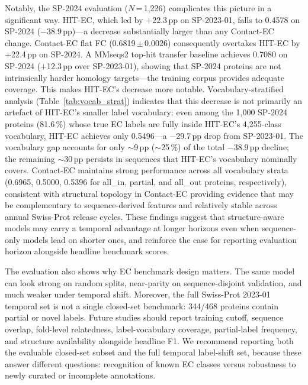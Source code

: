 \documentclass[numbered,contemporary,mediumone]{oup-authoring-template}
\begin{document}
Notably, the SP-2024 evaluation ($N$\,=\,1{,}226) complicates this picture in a
significant way. HIT-EC, which led by $+$22.3\,pp on SP-2023-01, falls to 0.4578
on SP-2024 ($-$38.9\,pp)---a decrease substantially larger than any Contact-EC
change. Contact-EC flat FC (0.6819\,$\pm$\,0.0026) consequently overtakes HIT-EC
by $+$22.4\,pp on SP-2024. A MMseqs2 top-hit transfer baseline achieves 0.7080 on SP-2024
($+$12.3\,pp over SP-2023-01), showing that SP-2024 proteins are not
intrinsically harder homology targets---the training corpus provides
adequate coverage. This makes HIT-EC's decrease more notable.
Vocabulary-stratified analysis (Table~\ref{tab:vocab_strat})
indicates that this decrease is not primarily an artefact of HIT-EC's smaller label
vocabulary: even among the 1{,}000 SP-2024 proteins (81.6\,\%) whose true EC labels
are fully inside HIT-EC's 4{,}255-class vocabulary, HIT-EC achieves only
0.5496---a $-$29.7\,pp drop from SP-2023-01. The vocabulary gap accounts
for only $\sim$9\,pp ($\sim$25\,\%) of the total $-$38.9\,pp decline; the
remaining $\sim$30\,pp persists in
sequences that HIT-EC's vocabulary nominally covers. Contact-EC maintains
strong performance across all vocabulary strata (0.6965, 0.5000, 0.5396 for
all\_in, partial, and all\_out proteins, respectively), consistent with structural
topology in Contact-EC providing evidence that may be complementary to sequence-derived features
and relatively stable across annual Swiss-Prot release cycles. These findings
suggest that structure-aware models may carry a temporal advantage at longer horizons
even when sequence-only models lead on shorter ones, and reinforce the case for
reporting evaluation horizon alongside headline benchmark scores.

The evaluation also shows why EC benchmark design matters. The same model can look
strong on random splits, near-parity on sequence-disjoint validation, and much
weaker under temporal shift. Moreover, the full Swiss-Prot 2023-01 temporal set is
not a single closed-set benchmark: 344/468 proteins contain partial or novel labels.
Future studies should report training cutoff, sequence overlap, fold-level
relatedness, label-vocabulary coverage, partial-label frequency, and structure availability alongside headline F1.
We recommend reporting both the evaluable closed-set subset and the full temporal
label-shift set, because these answer different questions: recognition of known EC
classes versus robustness to newly curated or incomplete annotations.
\end{document}
